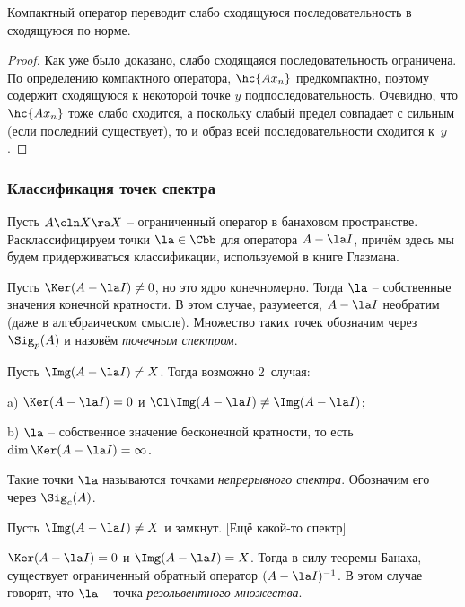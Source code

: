 \documentclass[a4paper]{article}
\begin{document}
\begin{imp}
Компактный оператор переводит слабо сходящуюся последовательность в сходящуюся по норме.
\end{imp}
\begin{proof}
Как уже было доказано, слабо сходящаяся последовательность ограничена.
По определению компактного оператора, $\hc{A x_n}$ предкомпактно,
поэтому содержит сходящуюся к некоторой точке $y$ подпоследовательность. Очевидно, что $\hc{Ax_n}$
тоже слабо сходится, а поскольку слабый предел совпадает с сильным (если последний существует),
то и образ всей последовательности сходится к~$y$.
\end{proof}


\subsubsection{Классификация точек спектра}

Пусть $A\cln X \ra X$ -- ограниченный оператор в банаховом пространстве. Расклассифицируем точки $\la \in \Cbb$
для оператора $A - \la I$, причём здесь мы будем придерживаться классификации, используемой в книге Глазмана.

\begin{items}{-2}
\item Пусть $\Ker(A-\la I) \neq 0$, но это ядро конечномерно. Тогда $\la$ -- собственные значения
конечной кратности. В этом случае, разумеется, $A - \la I$ необратим (даже в алгебраическом смысле).
Множество таких точек обозначим через $\Sig_p(A)$ и назовём \emph{точечным спектром}.
\item Пусть $\Img(A - \la I) \neq X$. Тогда возможно $2$~случая:
  \begin{items}{-2}
  \item[a)] $\Ker(A-\la I) = 0$ и $\Cl \Img (A - \la I) \neq \Img(A - \la I)$;
  \item[b)] $\la$ -- собственное значение бесконечной кратности, то есть $\dim \Ker(A - \la I) = \infty$.
  \end{items}
  Такие точки $\la$ называются точками \emph{непрерывного спектра}. Обозначим его через $\Sig_c(A)$.
\item Пусть $\Img(A - \la I) \neq X$ и замкнут. [Ещё какой-то спектр]
\item $\Ker(A - \la I) = 0$ и $\Img(A - \la I) = X$. Тогда в силу теоремы Банаха, существует
  ограниченный обратный оператор $(A - \la I)^{-1}$. В этом случае говорят, что $\la$ -- точка
  \emph{резольвентного множества}.
\end{items}
\end{document}

